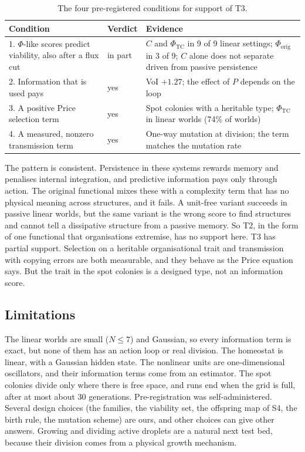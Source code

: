 \documentclass[11pt]{article}
\newcommand{\Phiorig}{\Phi_{\mathrm{orig}}}
\newcommand{\PhiTC}{\Phi_{\mathrm{TC}}}
\begin{document}
\begin{table}[t]
\centering
\small
\caption{The four pre-registered conditions for support of T3.}
\label{tab:t3}
\begin{tabular}{@{}p{5.2cm} p{1.6cm} p{6.6cm}@{}}
\toprule
Condition & Verdict & Evidence \\
\midrule
1. $\Phi$-like scores predict viability, also after a flux cut & in part & $C$ and $\PhiTC$ in 9 of 9 linear settings; $\Phiorig$ in 3 of 9; $C$ alone does not separate driven from passive persistence \\
2. Information that is used pays & yes & VoI $+1.27$; the effect of $P$ depends on the loop \\
3. A positive Price selection term & yes & Spot colonies with a heritable type; $\PhiTC$ in linear worlds (74\% of worlds) \\
4. A measured, nonzero transmission term & yes & One-way mutation at division; the term matches the mutation rate \\
\bottomrule
\end{tabular}
\end{table}

The pattern is consistent. Persistence in these systems rewards memory and penalises internal integration, and
predictive information pays only through action. The original functional mixes these with a complexity term that has
no physical meaning across structures, and it fails. A unit-free variant succeeds in passive linear worlds, but the same
variant is the wrong score to find structures and cannot tell a dissipative structure from a passive memory. So T2, in
the form of one functional that organisations extremise, has no support here. T3 has partial support. Selection on a heritable organisational trait and transmission with copying errors are
both measurable, and they behave as the Price equation says. But the trait in the spot colonies is a designed type, not an information score.

\subsection{Limitations}
The linear worlds are small ($N\le 7$) and Gaussian, so every information term is exact, but none of them has an action
loop or real division. The homeostat is linear, with a Gaussian hidden state. The nonlinear units are one-dimensional
oscillators, and their information terms come from an estimator. The spot colonies divide only where there is free
space, and runs end when the grid is full, after at most about 30 generations. Pre-registration was self-administered.
Several design choices (the families, the viability set, the offspring map of S4, the birth rule, the mutation scheme)
are ours, and other choices can give other answers. Growing and dividing active droplets \cite{Zwicker17} are a
natural next test bed, because their division comes from a physical growth mechanism.
\end{document}
